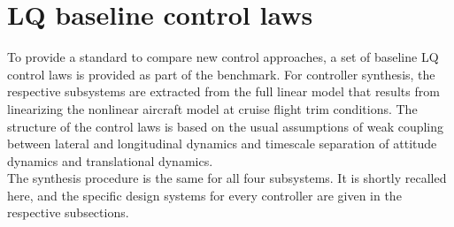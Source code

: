 \documentclass{ifacconf}
\begin{document}
\section{LQ baseline control laws}
\label{sec:lqr}
To provide a standard to compare new control approaches, a set of baseline LQ control laws is provided as part of the benchmark. For controller synthesis, the respective subsystems are extracted from the full linear model that results from linearizing the nonlinear aircraft model at cruise flight trim conditions. The structure of the control laws is based on the usual assumptions of weak coupling between lateral and longitudinal dynamics and timescale separation of attitude dynamics and translational dynamics.\\
The synthesis procedure is the same for all four subsystems. It is shortly recalled here, and the specific design systems for every controller are given in the respective subsections. 
\end{document}
